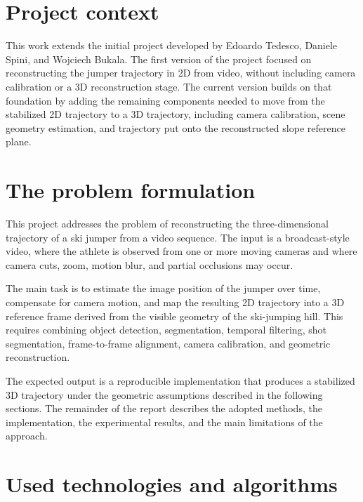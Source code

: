\section*{Project context}

This work extends the initial project developed by Edoardo Tedesco, Daniele Spini, and Wojciech Bukala.
The first version of the project focused on reconstructing the jumper trajectory in 2D from video, without including camera calibration or a 3D reconstruction stage.
The current version builds on that foundation by adding the remaining components needed to move from the stabilized 2D trajectory to a 3D trajectory, including camera calibration, scene geometry estimation, and trajectory put onto the reconstructed slope reference plane.

\section{The problem formulation}

This project addresses the problem of reconstructing the three-dimensional trajectory of a ski jumper from a video sequence.
The input is a broadcast-style video, where the athlete is observed from one or more moving cameras and where camera cuts, zoom, motion blur, and partial occlusions may occur.

The main task is to estimate the image position of the jumper over time, compensate for camera motion, and map the resulting 2D trajectory into a 3D reference frame derived from the visible geometry of the ski-jumping hill.
This requires combining object detection, segmentation, temporal filtering, shot segmentation, frame-to-frame alignment, camera calibration, and geometric reconstruction.

The expected output is a reproducible implementation that produces a stabilized 3D trajectory under the geometric assumptions described in the following sections.
The remainder of the report describes the adopted methods, the implementation, the experimental results, and the main limitations of the approach.

\section{Used technologies and algorithms}

